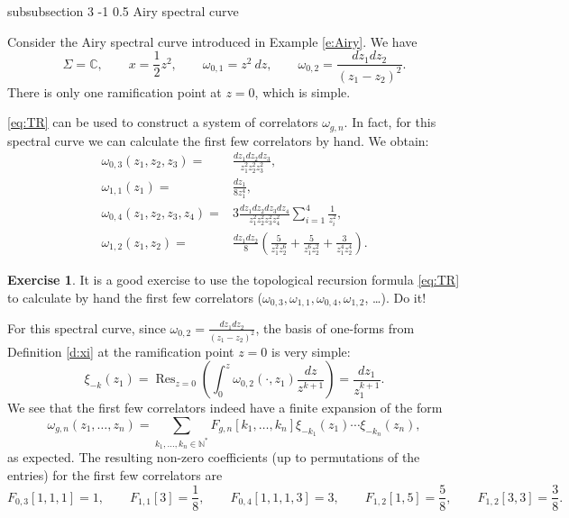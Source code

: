\documentclass[reqno,oneside,11pt]{amsart}
\makeatletter
\theoremstyle{plain}
\theoremstyle{definition}
\newtheorem*{exercise}{Exercise}
\theoremstyle{remark}
\numberwithin{equation}{section}
\renewcommand{\subsubsection}{\@startsection
{subsubsection}%
{3}%
{\z@}%
{-1\baselineskip}%
{0.5\baselineskip}%
{\normalfont \it \normalsize}} %
\DeclareMathOperator*{\Res}{Res}
\makeatother
\begin{document}
\subsubsection{Airy spectral curve}

Consider the Airy spectral curve introduced in Example \ref{e:Airy}. We have 
\begin{equation}
\Sigma = \mathbb{C}, \qquad x = \frac{1}{2}z^2, \qquad \omega_{0,1} = z^2\ dz, \qquad \omega_{0,2} = \frac{dz_1 dz_2}{(z_1-z_2)^2}.
\end{equation}
There is only one ramification point at $z=0$, which is simple.

\eqref{eq:TR} can be used to construct a system of correlators $\omega_{g,n}$. In fact, for this spectral curve we can calculate the first few correlators by hand. We obtain:
\begin{align}
\omega_{0,3}(z_1,z_2,z_3) =& \frac{dz_1 dz_2 dz_3}{z_1^2 z_2^2 z_3^2},\\
\omega_{1,1}(z_1) =& \frac{dz_1}{8 z_1^4},\\
\omega_{0,4}(z_1,z_2,z_3,z_4) =& 3 \frac{dz_1 dz_2 dz_3 dz_4}{z_1^2 z_2^2 z_3^2 z_4^2} \sum_{i=1}^4 \frac{1}{z_i^2},\\
\omega_{1,2}(z_1, z_2) =& \frac{dz_1 dz_2}{8} \left(\frac{5}{z_1^2 z_2^6} + \frac{5}{z_1^6 z_2^2} + \frac{3}{z_1^4 z_2^4} \right).
\end{align}

\begin{exercise}
It is a good exercise to use the topological recursion formula \eqref{eq:TR} to calculate by hand the first few correlators ($\omega_{0,3}, \omega_{1,1}, \omega_{0,4}, \omega_{1,2}$, \ldots). Do it!
\end{exercise}

For this spectral curve, since $\omega_{0,2}= \frac{dz_1 dz_2}{(z_1-z_2)^2}$, the basis of one-forms from Definition \ref{d:xi} at the ramification point $z=0$ is very simple:
\begin{equation}
\xi_{-k}(z_1) = \Res_{z=0} \left( \int^z_0 \omega_{0,2}(\cdot, z_1) \frac{d z}{z^{k+1}} \right) = \frac{d z_1}{z_1^{k+1}}.
\end{equation} 
We see that the first  few correlators indeed have a finite expansion of the form
\begin{equation}\label{eq:exairy}
\omega_{g,n}(z_1,\ldots,z_n) = \sum_{k_1, \ldots,k_n \in \mathbb{N}^*} F_{g,n}[k_1,\ldots,k_n] \xi_{-k_1}(z_1) \cdots \xi_{-k_n}(z_n),
\end{equation}
as expected. The resulting non-zero coefficients (up to permutations of the entries) for the first few correlators are
\begin{equation}
F_{0,3}[1,1,1] = 1, \qquad F_{1,1}[3] = \frac{1}{8}, \qquad F_{0,4}[1,1,1,3] = 3, \qquad F_{1,2}[1,5] = \frac{5}{8}, \qquad F_{1,2}[3,3] = \frac{3}{8}.
\end{equation}
\end{document}
